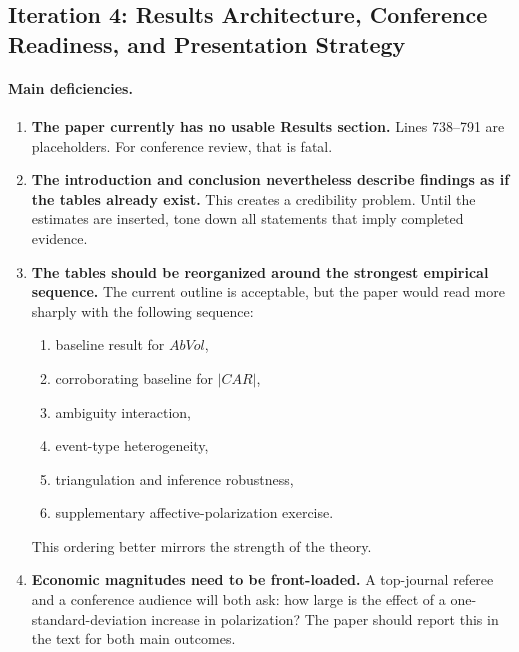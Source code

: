 \documentclass[12pt]{article}
\begin{document}
\subsection*{Iteration 4: Results Architecture, Conference Readiness, and Presentation Strategy}

\paragraph{Main deficiencies.}

\begin{enumerate}
    \item \textbf{The paper currently has no usable Results section.} Lines 738--791 are placeholders. For conference review, that is fatal.

    \item \textbf{The introduction and conclusion nevertheless describe findings as if the tables already exist.} This creates a credibility problem. Until the estimates are inserted, tone down all statements that imply completed evidence.

    \item \textbf{The tables should be reorganized around the strongest empirical sequence.} The current outline is acceptable, but the paper would read more sharply with the following sequence:
    \begin{enumerate}[label=(\roman*)]
        \item baseline result for $AbVol$,
        \item corroborating baseline for $|CAR|$,
        \item ambiguity interaction,
        \item event-type heterogeneity,
        \item triangulation and inference robustness,
        \item supplementary affective-polarization exercise.
    \end{enumerate}
    This ordering better mirrors the strength of the theory.

    \item \textbf{Economic magnitudes need to be front-loaded.} A top-journal referee and a conference audience will both ask: how large is the effect of a one-standard-deviation increase in polarization? The paper should report this in the text for both main outcomes.
\end{enumerate}
\end{document}

